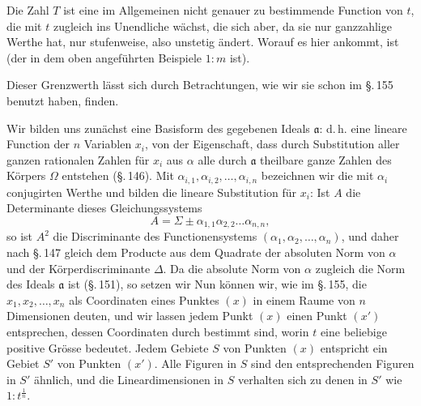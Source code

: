 Die Zahl $T$ ist eine im Allgemeinen nicht genauer zu bestimmende
 Function von $t$, die mit $t$ zugleich ins Unendliche
wächst, die sich aber, da sie nur ganzzahlige Werthe hat, nur
stufenweise, also unstetig ändert. Worauf es hier ankommt, ist
 (der in dem oben angeführten
 Beispiele $1:m$ ist).

Dieser Grenzwerth lässt sich durch Betrachtungen, wie wir
sie schon im \S.\,155 benutzt haben, finden.

Wir bilden uns zunächst eine Basisform des gegebenen Ideals $\mathfrak{a}$:
d.\,h. eine lineare Function der $n$ Variablen $x_i$, von der Eigenschaft,
dass durch Substitution aller ganzen rationalen Zahlen für
$x_i$ aus $\alpha$ alle durch $\mathfrak{a}$ theilbare ganze Zahlen des Körpers $\Omega$ entstehen
 (\S.\,146). Mit $\alpha_{i,1}, \alpha_{i,2}, \ldots, \alpha_{i,n}$ bezeichnen wir die mit $\alpha_i$
conjugirten Werthe und bilden die lineare Substitution für $x_i$:
Ist $A$ die Determinante dieses Gleichungssystems
\[
A = \Sigma \pm \alpha_{1,1} \alpha_{2,2} \ldots \alpha_{n,n},
\]
so ist $A^2$ die Discriminante des Functionensystems $(\alpha_1, \alpha_2, \ldots, \alpha_n)$,
und daher nach \S.\,147 gleich dem Producte aus dem Quadrate
der absoluten Norm von $\alpha$ und der Körperdiscriminante $\Delta$.
Da die absolute Norm von $\alpha$ zugleich die Norm des Ideals $\mathfrak{a}$
ist (\S.\,151), so setzen wir
Nun können wir, wie im \S.\,155, die $x_1, x_2, \ldots, x_n$ als
Coordinaten eines Punktes $(x)$ in einem Raume von $n$ Dimensionen
 deuten, und wir lassen jedem Punkt $(x)$ einen Punkt $(x')$
entsprechen, dessen Coordinaten durch
bestimmt sind, worin $t$ eine beliebige positive Grösse bedeutet.
Jedem Gebiete $S$ von Punkten $(x)$ entspricht ein Gebiet $S'$ von
Punkten $(x')$. Alle Figuren in $S$ sind den entsprechenden Figuren
in $S'$ ähnlich, und die Lineardimensionen in $S$ verhalten sich
zu denen in $S'$ wie $1 : t^{\frac{1}{n}}$.
